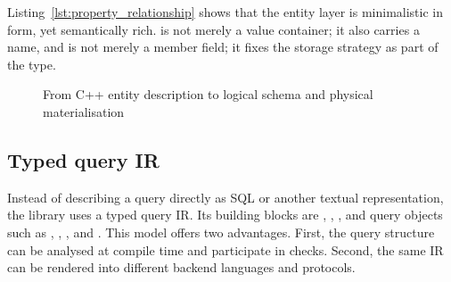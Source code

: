 Listing~\ref{lst:property_relationship} shows that the entity layer is minimalistic in form, yet semantically rich.  is not merely a value container; it also carries a name, and  is not merely a member field; it fixes the storage strategy as part of the type.

\begin{figure}[H]
\centering
{}
\caption{From C++ entity description to logical schema and physical materialisation}
\label{fig:entity_to_schema_mapping}
\end{figure}

\subsection{Typed query IR}

Instead of describing a query directly as SQL or another textual representation, the library uses a typed query IR. Its building blocks are , , , and query objects such as , , , and . This model offers two advantages. First, the query structure can be analysed at compile time and participate in  checks. Second, the same IR can be rendered into different backend languages and protocols.

